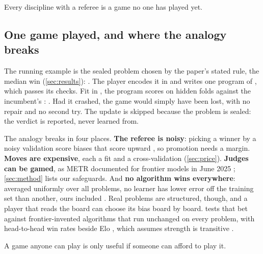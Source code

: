 \begin{keyidea}
Every discipline with a referee is a game no one has played yet.
\end{keyidea}

\subsection{One game played, and where the analogy breaks}\label{sub:game-played}

The running example is the sealed problem chosen by the paper's stated rule,
the median win (\cref{sec:results}): . The
player encodes it in  and writes one program of , which
passes its checks. Fit in , the program scores  on hidden
folds against the incumbent's : . Had it
crashed, the game would simply have been lost, with no repair and no second try.
The update is skipped because the problem is sealed: the verdict is reported,
never learned from.

The analogy breaks in four places. \textbf{The referee is noisy}: picking a
winner by a noisy validation score biases that score upward
\citep{cawley2010overfitting}, so promotion needs a margin. \textbf{Moves are expensive}, each a fit and a cross-validation
(\cref{sec:price}). \textbf{Judges can be gamed}, as METR documented for
frontier models in June 2025 \citep{metr2025rewardhacking}; \cref{sec:method}
lists our safeguards. And \textbf{no algorithm wins everywhere}: averaged
uniformly over all problems, no learner has lower error off the training set
than another, ours included \citep{wolpert1996nfl}. Real problems are structured, though, and a player that
reads the board can choose its bias board by board.  tests
that bet against frontier-invented algorithms that run unchanged on every
problem, with head-to-head win rates beside Elo \citep{elo1978rating}, which
assumes strength is transitive \citep{balduzzi2018reevaluating}.

A game anyone can play is only useful if someone can afford to play it.
